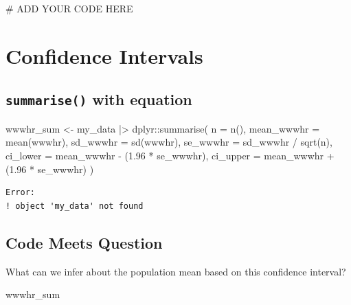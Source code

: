 \documentclass[
  letterpaper,
  DIV=11,
  numbers=noendperiod]{scrartcl}
\newenvironment{Shaded}{\begin{snugshade}}{\end{snugshade}}
\newcommand{\AttributeTok}[1]{\textcolor[rgb]{0.40,0.45,0.13}{#1}}
\newcommand{\CommentTok}[1]{\textcolor[rgb]{0.37,0.37,0.37}{#1}}
\newcommand{\FloatTok}[1]{\textcolor[rgb]{0.68,0.00,0.00}{#1}}
\newcommand{\FunctionTok}[1]{\textcolor[rgb]{0.28,0.35,0.67}{#1}}
\newcommand{\NormalTok}[1]{\textcolor[rgb]{0.00,0.23,0.31}{#1}}
\newcommand{\OtherTok}[1]{\textcolor[rgb]{0.00,0.23,0.31}{#1}}
\newcommand{\SpecialCharTok}[1]{\textcolor[rgb]{0.37,0.37,0.37}{#1}}
\begin{document}
\begin{Shaded}
\begin{Highlighting}[]
\CommentTok{\# ADD YOUR CODE HERE}
\end{Highlighting}
\end{Shaded}

\section{Confidence Intervals}\label{confidence-intervals}

\subsection{\texorpdfstring{\texttt{summarise()} with
equation}{summarise() with equation}}\label{summarise-with-equation}

\begin{Shaded}
\begin{Highlighting}[]
\NormalTok{wwwhr\_sum }\OtherTok{\textless{}{-}}\NormalTok{ my\_data }\SpecialCharTok{|\textgreater{}}
\NormalTok{  dplyr}\SpecialCharTok{::}\FunctionTok{summarise}\NormalTok{(}
    \AttributeTok{n =} \FunctionTok{n}\NormalTok{(),}
    \AttributeTok{mean\_wwwhr =} \FunctionTok{mean}\NormalTok{(wwwhr),}
    \AttributeTok{sd\_wwwhr =} \FunctionTok{sd}\NormalTok{(wwwhr),}
    \AttributeTok{se\_wwwhr =}\NormalTok{ sd\_wwwhr }\SpecialCharTok{/} \FunctionTok{sqrt}\NormalTok{(n),}
    \AttributeTok{ci\_lower =}\NormalTok{ mean\_wwwhr }\SpecialCharTok{{-}}\NormalTok{ (}\FloatTok{1.96} \SpecialCharTok{*}\NormalTok{ se\_wwwhr),}
    \AttributeTok{ci\_upper =}\NormalTok{ mean\_wwwhr }\SpecialCharTok{+}\NormalTok{ (}\FloatTok{1.96} \SpecialCharTok{*}\NormalTok{ se\_wwwhr)}
\NormalTok{    )}
\end{Highlighting}
\end{Shaded}

\begin{verbatim}
Error:
! object 'my_data' not found
\end{verbatim}

\subsection{Code Meets Question}\label{code-meets-question}

What can we infer about the population mean based on this confidence
interval?

\begin{Shaded}
\begin{Highlighting}[]
\NormalTok{wwwhr\_sum}
\end{Highlighting}
\end{Shaded}
\end{document}
